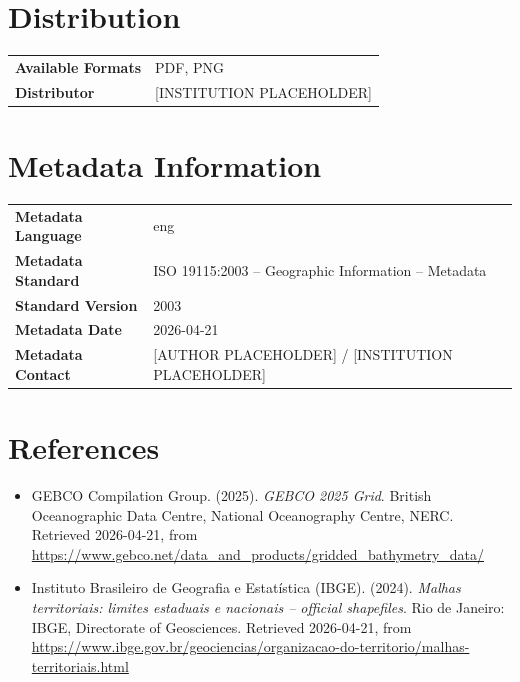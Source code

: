 \documentclass[12pt, a4paper]{article}
\begin{document}
\section{Distribution}

\begin{tabular}{>{\bfseries}p{5cm} p{9cm}}
Available Formats & PDF, PNG \\
Distributor       & [INSTITUTION PLACEHOLDER] \\
\end{tabular}

\section{Metadata Information}

\begin{tabular}{>{\bfseries}p{5cm} p{9cm}}
Metadata Language        & eng \\
Metadata Standard        & ISO 19115:2003 -- Geographic Information -- Metadata \\
Standard Version         & 2003 \\
Metadata Date            & 2026-04-21 \\
Metadata Contact         & [AUTHOR PLACEHOLDER] / [INSTITUTION PLACEHOLDER] \\
\end{tabular}

\section*{References}

\begin{itemize}
    \item GEBCO Compilation Group. (2025). \textit{GEBCO 2025 Grid}. British Oceanographic Data Centre, National Oceanography Centre, NERC. Retrieved 2026-04-21, from \url{https://www.gebco.net/data_and_products/gridded_bathymetry_data/}

    \item Instituto Brasileiro de Geografia e Estatística (IBGE). (2024). \textit{Malhas territoriais: limites estaduais e nacionais -- official shapefiles}. Rio de Janeiro: IBGE, Directorate of Geosciences. Retrieved 2026-04-21, from \url{https://www.ibge.gov.br/geociencias/organizacao-do-territorio/malhas-territoriais.html}
\end{itemize}
\end{document}
